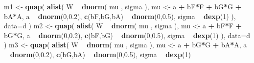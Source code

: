 \documentclass[
]{article}
\newenvironment{Shaded}{\begin{snugshade}}{\end{snugshade}}
\newcommand{\DataTypeTok}[1]{\textcolor[rgb]{0.13,0.29,0.53}{#1}}
\newcommand{\DecValTok}[1]{\textcolor[rgb]{0.00,0.00,0.81}{#1}}
\newcommand{\FloatTok}[1]{\textcolor[rgb]{0.00,0.00,0.81}{#1}}
\newcommand{\KeywordTok}[1]{\textcolor[rgb]{0.13,0.29,0.53}{\textbf{#1}}}
\newcommand{\NormalTok}[1]{#1}
\newcommand{\OperatorTok}[1]{\textcolor[rgb]{0.81,0.36,0.00}{\textbf{#1}}}
\newcommand{\StringTok}[1]{\textcolor[rgb]{0.31,0.60,0.02}{#1}}
\begin{document}
\begin{Shaded}
\begin{Highlighting}[]
\NormalTok{m1 <-}\StringTok{ }\KeywordTok{quap}\NormalTok{(}
    \KeywordTok{alist}\NormalTok{(}
\NormalTok{        W }\OperatorTok{~}\StringTok{ }\KeywordTok{dnorm}\NormalTok{( mu , sigma ),}
\NormalTok{        mu <-}\StringTok{ }\NormalTok{a }\OperatorTok{+}\StringTok{ }\NormalTok{bF}\OperatorTok{*}\NormalTok{F }\OperatorTok{+}\StringTok{ }\NormalTok{bG}\OperatorTok{*}\NormalTok{G }\OperatorTok{+}\StringTok{ }\NormalTok{bA}\OperatorTok{*}\NormalTok{A,}
\NormalTok{        a }\OperatorTok{~}\StringTok{ }\KeywordTok{dnorm}\NormalTok{(}\DecValTok{0}\NormalTok{,}\FloatTok{0.2}\NormalTok{),}
        \KeywordTok{c}\NormalTok{(bF,bG,bA) }\OperatorTok{~}\StringTok{ }\KeywordTok{dnorm}\NormalTok{(}\DecValTok{0}\NormalTok{,}\FloatTok{0.5}\NormalTok{),}
\NormalTok{        sigma }\OperatorTok{~}\StringTok{ }\KeywordTok{dexp}\NormalTok{(}\DecValTok{1}\NormalTok{)}
\NormalTok{    ), }\DataTypeTok{data=}\NormalTok{d )}
\NormalTok{m2 <-}\StringTok{ }\KeywordTok{quap}\NormalTok{(}
    \KeywordTok{alist}\NormalTok{(}
\NormalTok{        W }\OperatorTok{~}\StringTok{ }\KeywordTok{dnorm}\NormalTok{( mu , sigma ),}
\NormalTok{        mu <-}\StringTok{ }\NormalTok{a }\OperatorTok{+}\StringTok{ }\NormalTok{bF}\OperatorTok{*}\NormalTok{F }\OperatorTok{+}\StringTok{ }\NormalTok{bG}\OperatorTok{*}\NormalTok{G,}
\NormalTok{        a }\OperatorTok{~}\StringTok{ }\KeywordTok{dnorm}\NormalTok{(}\DecValTok{0}\NormalTok{,}\FloatTok{0.2}\NormalTok{),}
        \KeywordTok{c}\NormalTok{(bF,bG) }\OperatorTok{~}\StringTok{ }\KeywordTok{dnorm}\NormalTok{(}\DecValTok{0}\NormalTok{,}\FloatTok{0.5}\NormalTok{),}
\NormalTok{        sigma }\OperatorTok{~}\StringTok{ }\KeywordTok{dexp}\NormalTok{(}\DecValTok{1}\NormalTok{)}
\NormalTok{    ), }\DataTypeTok{data=}\NormalTok{d )}
\NormalTok{m3 <-}\StringTok{ }\KeywordTok{quap}\NormalTok{(}
    \KeywordTok{alist}\NormalTok{(}
\NormalTok{        W }\OperatorTok{~}\StringTok{ }\KeywordTok{dnorm}\NormalTok{( mu , sigma ),}
\NormalTok{        mu <-}\StringTok{ }\NormalTok{a }\OperatorTok{+}\StringTok{ }\NormalTok{bG}\OperatorTok{*}\NormalTok{G }\OperatorTok{+}\StringTok{ }\NormalTok{bA}\OperatorTok{*}\NormalTok{A,}
\NormalTok{        a }\OperatorTok{~}\StringTok{ }\KeywordTok{dnorm}\NormalTok{(}\DecValTok{0}\NormalTok{,}\FloatTok{0.2}\NormalTok{),}
        \KeywordTok{c}\NormalTok{(bG,bA) }\OperatorTok{~}\StringTok{ }\KeywordTok{dnorm}\NormalTok{(}\DecValTok{0}\NormalTok{,}\FloatTok{0.5}\NormalTok{),}
\NormalTok{        sigma }\OperatorTok{~}\StringTok{ }\KeywordTok{dexp}\NormalTok{(}\DecValTok{1}\NormalTok{)}

\end{Highlighting}
\end{Shaded}
\end{document}
